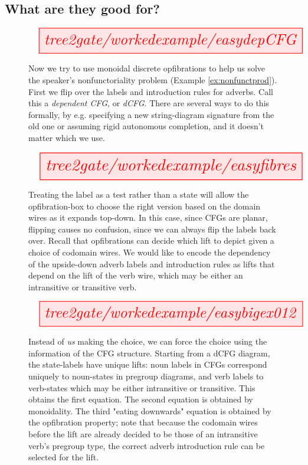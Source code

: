 \clearpage

\subsection{What are they good for?}

\begin{figure}[h!]
\[\resizebox{\textwidth}{!}{\tikzfig{tree2gate/workedexample/easydepCFG}}\]
\caption{
Now we try to use monoidal discrete opfibrations to help us solve the speaker's nonfunctoriality problem (Example \ref{ex:nonfunctprod}). First we flip over the labels and introduction rules for adverbs. Call this a \emph{dependent CFG}, or \emph{dCFG}. There are several ways to do this formally, by e.g. specifying a new string-diagram signature from the old one or assuming rigid autonomous completion, and it doesn't matter which we use.
}
\end{figure}

\begin{figure}[h!]
\[\resizebox{\textwidth}{!}{\tikzfig{tree2gate/workedexample/easyfibres}}\]
\caption{
Treating the label as a test rather than a state will allow the opfibration-box to choose the right version based on the domain wires as it expands top-down. In this case, since CFGs are planar, flipping causes no confusion, since we can always flip the labels back over. Recall that opfibrations can decide which lift to depict given a choice of codomain wires. We would like to encode the dependency of the upside-down adverb labels and introduction rules as lifts that depend on the lift of the verb wire, which may be either an intransitive or transitive verb.
}
\end{figure}

\begin{figure}[h!]
\[\resizebox{\textwidth}{!}{\tikzfig{tree2gate/workedexample/easybigex012}}\]
\caption{
Instead of \emph{us} making the choice, we can force the choice using the information of the CFG structure. Starting from a dCFG diagram, the state-labels have unique lifts: noun labels in CFGs correspond uniquely to noun-states in pregroup diagrams, and verb labels to verb-states which may be either intransitive or transitive. This obtains the first equation. The second equation is obtained by monoidality. The third "eating downwards" equation is obtained by the opfibration property; note that because the codomain wires before the lift are already decided to be those of an intransitive verb's pregroup type, the correct adverb introduction rule can be selected for the lift.
}
\end{figure}

